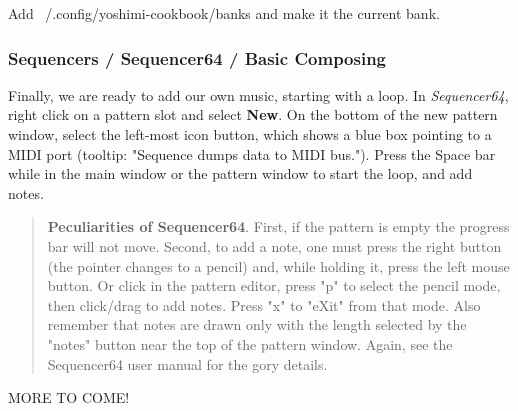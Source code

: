    Add ~/.config/yoshimi-cookbook/banks and make it the current bank.

\subsubsection{Sequencers / Sequencer64 / Basic Composing}
\label{subsubsec:sequencers_seq64_basic_composing}

   Finally, we are ready to add our own music, starting
   with a loop.  In \textsl{Sequencer64}, right click
   on a pattern slot and select \textbf{New}.  On the bottom of the new pattern
   window, select the left-most icon button, which shows a blue box pointing to
   a MIDI port (tooltip: "Sequence dumps data to MIDI bus.").
   Press the Space bar while in the main window or the pattern window
   to start the loop, and add notes.

   \begin{quotation}
      \textbf{Peculiarities of Sequencer64}.
      First, if the pattern is empty the
      progress bar will not move.  Second, to add a note, one must press
      the right button (the pointer changes to a pencil) and, while holding
      it, press the left mouse button.  Or click in the pattern editor, press
      "p" to select the pencil mode, then click/drag to add notes.  Press "x"
      to "eXit" from that mode.  Also remember that notes are drawn only with
      the length selected by the "notes" button near the top of the pattern
      window.  Again, see the Sequencer64 user manual for the gory details.
   \end{quotation}

   MORE TO COME!

